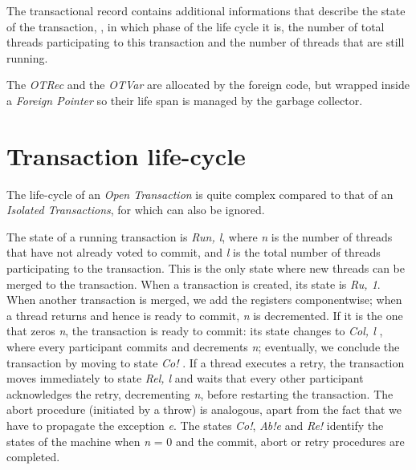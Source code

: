 The transactional record contains additional informations that describe the state of the transaction, \ie, in which phase of the life cycle it is, the number of total threads participating to this transaction and the number of threads that are still running.

The \emph{OTRec} and the \emph{OTVar} are allocated by the foreign code, but wrapped inside a \emph{Foreign Pointer} so their life span is managed by the garbage collector.

\section{Transaction life-cycle}

The life-cycle of an \emph{Open Transaction} is quite complex compared to that of an \emph{Isolated Transactions}, for which can also be ignored.

The state of a running transaction is \emph{Ru\textlangle n, l\textrangle}, where \emph{n} is the number of threads that have not already voted to commit, and \emph{l} is the total number of threads participating to the transaction.
This is the only state where new threads can be merged to the transaction. When a transaction is created, its state is \emph{Ru, 1\textrangle}.
When another transaction is merged, we add the registers componentwise; when a thread returns and hence is ready to commit, \emph{n} is decremented.
If it is the one that zeros \emph{n}, the transaction is ready to commit: its state changes to \emph{Co\textlangle l, l\textrangle} , where every participant commits and decrements \emph{n}; eventually, we conclude the transaction by moving to state \emph{Co!\textlangle \textrangle} .
If a thread executes a retry, the transaction moves immediately to state \emph{Re\textlangle l, l\textrangle} and waits that every other participant acknowledges the retry, decrementing \emph{n}, before restarting the transaction.
The abort procedure (initiated by a throw) is analogous, apart from the fact that we have to propagate the exception \emph{e}.
The states \emph{Co!\textlangle \textrangle }, \emph{Ab!\textlangle e\textrangle}  and \emph{Re!\textlangle \textrangle}  identify the states of the machine when \emph{n} = 0 and the commit, abort or retry procedures are completed.

